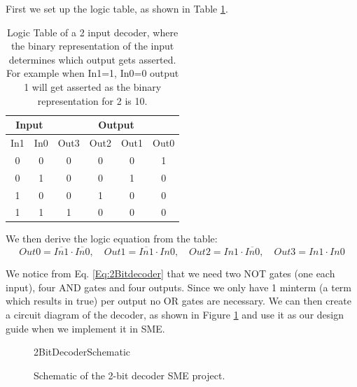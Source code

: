         First we set up the logic table, as shown in Table \ref{LogicTable:2BitDecoder}. 
        \begin{table}[h!]
            \centering
            \begin{tabular}{|c|c||c|c|c|c|}
                \hline
                \multicolumn{2}{|c||}{\textbf{Input}}& \multicolumn{4}{c|}{\textbf{Output}}                  \\ \hline
                In1        & In0        & Out3 & Out2 & Out1 & Out0 \\ \hline
                0          & 0          & 0    & 0    & 0    & 1    \\ \hline
                0          & 1          & 0    & 0    & 1    & 0    \\ \hline
                1          & 0          & 0    & 1    & 0    & 0    \\ \hline
                1          & 1          & 1    & 0    & 0    & 0    \\ \hline
            \end{tabular}
            \caption{Logic Table of a 2 input decoder, where the binary representation of the input determines which output gets asserted. For example when In1=1, In0=0 output 1 will get asserted as the binary representation for 2 is 10.}
            \label{LogicTable:2BitDecoder}
        \end{table}
    
        We then derive the logic equation from the table: 
        \begin{equation}
        \label{Eq:2Bitdecoder}
                Out0 = \overline{In1} \cdot \overline{In0}, \quad
                Out1 = \overline{In1} \cdot In0, \quad
                Out2 = In1 \cdot \overline{In0}, \quad
                Out3 = In1 \cdot In0
        \end{equation}
        
        We notice from Eq. \ref{Eq:2Bitdecoder} that we need two NOT gates (one each input), four AND gates and four outputs. Since we only have 1 minterm (a term which results in true) per output no OR gates are necessary.
        We can then create a circuit diagram of the decoder, as shown in Figure \ref{fig:2BitDecoderSchematic} and use it as our design guide when we implement it in SME.
        \begin{figure}[h!]
            \centering
            {2BitDecoderSchematic}
            \caption{Schematic of the 2-bit decoder SME project.}
            \label{fig:2BitDecoderSchematic}
        \end{figure}
        
